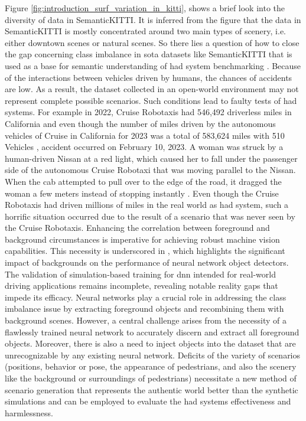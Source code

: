 Figure \ref{fig:introduction_surf_variation_in_kitti}, shows a brief look into the diversity of data in SemanticKITTI. It is inferred from the figure that the data in SemanticKITTI is mostly concentrated around two main types of scenery, i.e. either downtown scenes or natural scenes. So there lies a question of how to close the gap concerning class imbalance in \acrfull{sota} datasets like SemanticKITTI that is used as a base for semantic understanding of \acrshort{had} system benchmarking \parencite{papers-with-code}. Because of the interactions between vehicles driven by humans, the chances of accidents are low. As a result, the dataset collected in an open-world environment may not represent complete possible scenarios. Such conditions lead to faulty tests of \acrshort{had} systems. For example in 2022, Cruise Robotaxis had 546,492 driverless miles in California and even though the number of miles driven by the autonomous vehicles of Cruise in California for 2023 was a total of 583,624 miles with 510 Vehicles \parencite{disengagement_report}, accident occurred on February 10, 2023. A woman was struck by a human-driven Nissan at a red light, which caused her to fall under the passenger side of the autonomous Cruise Robotaxi that was moving parallel to the Nissan. When the cab attempted to pull over to the edge of the road, it dragged the woman a few meters instead of stopping instantly \parencite{cruise_crash}. Even though the Cruise Robotaxis had driven millions of miles in the real world as \acrshort{had} system, such a horrific situation occurred due to the result of a scenario that was never seen by the Cruise Robotaxis. 
Enhancing the correlation between foreground and background circumstances is imperative for achieving robust machine vision capabilities. This necessity is underscored in \parencite{noise_or_signal}, which highlights the significant impact of backgrounds on the performance of neural network object detectors.
The validation of simulation-based training for \acrshort{dnn} intended for real-world driving applications remains incomplete, revealing notable reality gaps \parencite{care_real_and_syn_gap} that impede its efficacy.
Neural networks play a crucial role in addressing the class imbalance issue by extracting foreground objects and recombining them with background scenes. However, a central challenge arises from the necessity of a flawlessly trained neural network to accurately discern and extract all foreground objects. Moreover, there is also a need to inject objects into the dataset that are unrecognizable by any existing neural network.
Deficits of the variety of scenarios (positions, behavior or pose, the appearance of pedestrians, and also the scenery like the background or surroundings of pedestrians) necessitate a new method of scenario generation that represents the authentic world better than the synthetic simulations and can be employed to evaluate the \acrshort{had} systems effectiveness and harmlessness.

